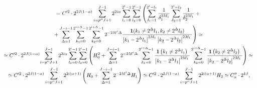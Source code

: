 \noindent
\begin{multline*}
{}= C'^2 \cdot2^{2J(1-\alpha)} \sum\limits_{i = p''J + 1}^{J - 1}
2^{2i\alpha}\sum\limits_{l_1 = 0}^{2^i - 1} \sum\limits_{l_2 = 0}^{2^i - 1}
\left( \sum\limits_{\delta_1 = 1}^{2^i - l_1}
\displaystyle\frac{\displaystyle 1\mathstrut}{\displaystyle \delta_1^{2M_1}\mathstrut}\sum\limits_{\delta_2 = 1}^{2^i - l_2} \displaystyle\frac{\displaystyle 1\mathstrut}{\displaystyle \delta_2^{2M_1}\mathstrut} +{}\right.\\
\left.{}+ \sum\limits_{\Delta = 1}^{J-i-1}\sum\limits_{k_1 = 0}^{2^{i+\Delta} - 1}
\sum\limits_{k_2 = 0}^{2^{i+\Delta} - 1} 2^{-2M'\Delta}
\displaystyle\frac{\displaystyle \mathbf{1}(k_1 \neq 2^{\Delta} l_1,k_2 \neq 2^{\Delta} l_2)\mathstrut}{\displaystyle \left\vert k_1 - 2^{\Delta} l_1\right\vert^{2M_1} \left\vert k_2 - 2^{\Delta} l_2
\right\vert^{2M_1}\mathstrut} \right) \simeq{}
\\
{}\simeq C'^2 \cdot2^{2J(1-\alpha)} \!\sum\limits_{i = p''J + 1}^{J - 1} 2^{2i\alpha}
\sum\limits_{l_1 = 0}^{2^i - 1} \sum\limits_{l_2 = 0}^{2^i - 1} \left( H^2_0
+ \sum\limits_{\Delta = 1}^{J-i-1}2^{-2M'\Delta}
\sum\limits_{k_1 = 0}^{2^{i+\Delta} - 1}
\displaystyle\frac{\displaystyle \mathbf{1}\left(k_1 \neq 2^{\Delta} l_1\right)\mathstrut}{\displaystyle \left\vert k_1 -2^{\Delta}l_1\right\vert^{2M_1}\mathstrut}
\sum\limits_{k_2 = 0}^{2^{i+\Delta} - 1} \displaystyle\frac{\displaystyle \mathbf{1}\left(k_2 \neq 2^{\Delta} l_2\right)\mathstrut}{\displaystyle \left\vert k_2 -2^{\Delta}l_2\right\vert^{2M_1}\mathstrut} \right)\simeq{}\\
{}\simeq  C'^2 \cdot 2^{2J(1-\alpha)} \sum\limits_{i = p''J + 1}^{J - 1}
2^{2i(\alpha+1)} \left( H_0
+ \sum\limits_{\Delta = 1}^{J-i-1}2^{-2M'\Delta} H_1 \right)
\simeq C'^2\cdot 2^{2J(1-\alpha)}
\sum\limits_{i = p''J + 1}^{J - 1} 2^{2i(\alpha+1)} H_2
\simeq C''_\alpha \cdot 2^{4J},
\end{multline*}

